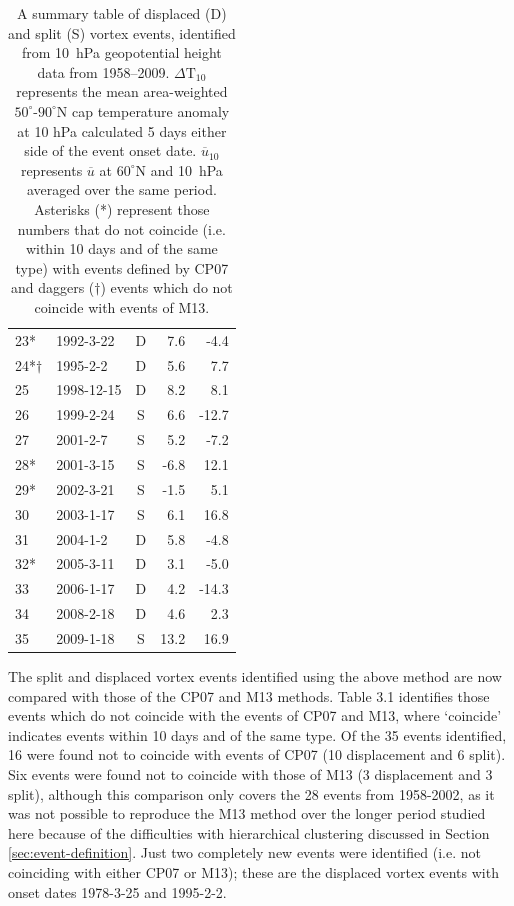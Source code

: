 \begin{table}
\begin{centering}
\begin{tabular}{llcrr}
    23* & 1992-3-22   & D          & 7.6        & -4.4 \\
    24*$\dagger$ & 1995-2-2    & D          & 5.6        & 7.7 \\
    25  & 1998-12-15  & D          & 8.2        & 8.1 \\
    26  & 1999-2-24   & S          & 6.6        & -12.7 \\
    27  & 2001-2-7    & S          & 5.2        & -7.2 \\
    28* & 2001-3-15   & S          & -6.8       & 12.1 \\
    29* & 2002-3-21   & S          & -1.5       & 5.1 \\
    30  & 2003-1-17   & S          & 6.1        & 16.8 \\
    31  & 2004-1-2    & D          & 5.8        & -4.8 \\
    32* & 2005-3-11   & D          & 3.1        & -5.0 \\
    33  & 2006-1-17   & D          & 4.2        & -14.3 \\
    34  & 2008-2-18   & D          & 4.6        & 2.3 \\
    35  & 2009-1-18   & S          & 13.2       & 16.9 \\ \hline
    \end{tabular}
    \caption{A summary table of displaced (D) and split (S) vortex events,
      identified from 10~hPa geopotential height data from 1958--2009.
      $\Delta \mathrm{T}_{10}$ represents the mean area-weighted
      $50^{\circ}$-$90^{\circ}$N cap temperature anomaly at 10 hPa calculated 5
      days either side of the event onset date. $\overline{u}_{10}$ represents
      $\overline{u}$ at $60^{\circ}$N and 10~hPa averaged over the same
      period. Asterisks (*) represent those numbers that do not coincide
      (i.e. within 10 days and of the same type) with events defined by CP07 and
      daggers ($\dagger$) events which do not coincide with events of M13.}
  \end{centering}
  \label{tab:events}
\end{table}

The split and displaced vortex events identified using the above method are now
compared with those of the CP07 and M13 methods. Table 3.1 identifies those
events which do not coincide with the events of CP07 and M13, where `coincide'
indicates events within 10 days and of the same type. Of the 35 events
identified, 16 were found not to coincide with events of CP07 (10 displacement
and 6 split). Six events were found not to coincide with those of M13 (3
displacement and 3 split), although this comparison only covers the 28 events
from 1958-2002, as it was not possible to reproduce the M13 method over the
longer period studied here because of the difficulties with hierarchical
clustering discussed in Section \ref{sec:event-definition}. Just two completely
new events were identified (i.e. not coinciding with either CP07 or M13); these
are the displaced vortex events with onset dates 1978-3-25 and 1995-2-2.

